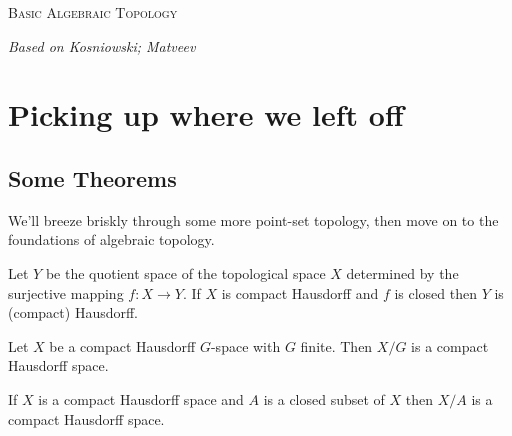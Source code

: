 \documentclass[nocover]{pset}
\begin{document}
\begin{center}
  {\scshape \Large Basic Algebraic Topology}

  {\itshape Based on Kosniowski; Matveev}
\end{center}
\vspace{-.1cm}
\hrulefill

\section{Picking up where we left off}
\begin{adjustwidth}{1em}{1em}
  \subsection{Some Theorems}
  We'll breeze briskly through some more point-set topology, then move
  on to the foundations of algebraic topology.
  \begin{theorem}
    Let $Y$ be the quotient space of the topological space $X$
    determined by the surjective mapping $f : X \to Y$. If $X$ is
    compact Hausdorff and $f$ is closed then $Y$ is (compact)
    Hausdorff.
  \end{theorem}
  \begin{corollary}
    Let $X$ be a compact Hausdorff $G$-space with $G$ finite. Then
    $X/G$ is a compact Hausdorff space.
  \end{corollary}
  \begin{corollary}
    If $X$ is a compact Hausdorff space and $A$ is a closed subset of
    $X$ then $X/A$ is a compact Hausdorff space.
  \end{corollary}
  \end{adjustwidth}
\end{document}
